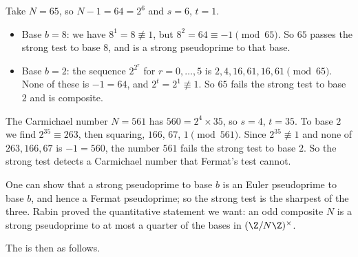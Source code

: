 \begin{example}
	Take $N = 65$, so $N - 1 = 64 = 2^6$ and $s = 6$, $t = 1$.
	\begin{itemize}
		\item Base $b = 8$: we have $8^1 = 8 \not\equiv1$, but $8^2 = 64 \equiv -1 \pmod{65}$. So $65$ passes the strong test to base $8$, and is a strong pseudoprime to that base.
		\item Base $b = 2$: the sequence $2^{2^r}$ for $r = 0, \dots, 5$ is $2, 4, 16, 61, 16, 61 \pmod{65}$. None of these is $-1 = 64$, and $2^t = 2^1 \not\equiv 1$. So $65$ fails the strong test to base $2$ and is composite.
	\end{itemize}
\end{example}

\begin{example}
	The Carmichael number $N = 561$ has $560 = 2^4\times35$, so $s = 4$, $t = 35$. To base $2$ we find $2^{35}\equiv263$, then squaring, $166$, $67$, $1 \pmod{561}$. Since $2^{35}\not\equiv1$ and none of $263, 166, 67$ is $-1 = 560$, the number $561$ fails the strong test to base $2$. So the strong test detects a Carmichael number that Fermat's test cannot.
\end{example}

\begin{remark}
	One can show that a strong pseudoprime to base $b$ is an Euler pseudoprime to base $b$, and hence a Fermat pseudoprime; so the strong test is the sharpest of the three. Rabin proved the quantitative statement we want: an odd composite $N$ is a strong pseudoprime to at most a quarter of the bases in $(\Z/N\Z)^\times$.
\end{remark}

The  is then as follows.

